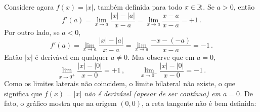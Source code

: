 \begin{ex}
Considere agora $f(x)=|x|$, também definida para todo $x\in \mathbb{R}$. Se $a>0$,
então
$$f'(a)=\lim_{x\to a}\frac{|x|-|a|}{x-a}=
\lim_{x\to a}\frac{x-a}{x-a}=+1\,.$$
Por outro lado, se $a<0$,
$$f'(a)=\lim_{x\to a}\frac{|x|-|a|}{x-a}=
\lim_{x\to a}\frac{-x-(-a)}{x-a}=-1\,.$$
Então $|x|$ é derivável em qualquer $a\neq 0$.
Mas observe que em $a=0$, 
$$\lim_{x\to 0^+}\frac{|x|-|0|}{x-0}=+1\,,\quad \quad
\lim_{x\to 0^-}\frac{|x|-|0|}{x-0}=-1\,.$$
Como os limites laterais não coincidem, o limite bilateral não existe, o que
significa que $f(x)=|x|$ \emph{não é derivável (apesar de ser contínua) em
$a=0$.} De fato, o gráfico mostra que na origem $(0,0)$, a reta tangente não é
bem definida:

\begin{center}
\begin{bmlimage}\end{bmlimage}
\end{center}

\end{ex}

